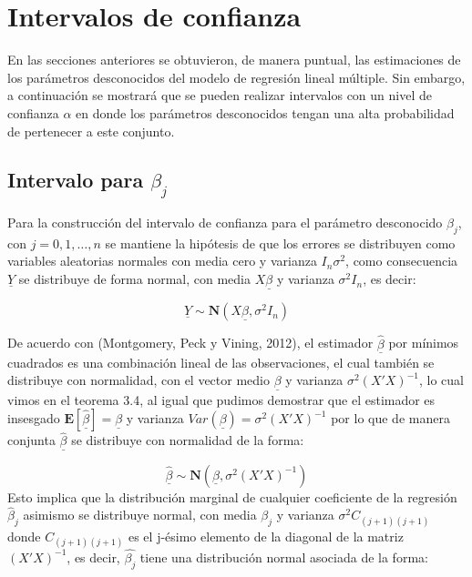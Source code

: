 \documentclass[
  a4paper,
  oneside,
  openany]{book}
\begin{document}
\hypertarget{intervalos-de-confianza-2}{%
\chapter{Intervalos de confianza}\label{intervalos-de-confianza-2}}

En las secciones anteriores se obtuvieron, de manera puntual, las estimaciones de los parámetros desconocidos del modelo de regresión lineal múltiple. Sin embargo, a continuación se mostrará que se pueden realizar intervalos con un nivel de confianza \(\alpha\) en donde los parámetros desconocidos tengan una alta probabilidad de pertenecer a este conjunto.

\hypertarget{intervalo-para-beta_j}{%
\section{\texorpdfstring{Intervalo para \(\beta_{j}\)}{Intervalo para \textbackslash beta\_\{j\}}}\label{intervalo-para-beta_j}}

Para la construcción del intervalo de confianza para el parámetro desconocido \(\beta_{j}\), con \(j=0,1,\ldots,n\) se mantiene la hipótesis de que los errores se distribuyen como variables aleatorias normales con media cero y varianza \(I_{n}\sigma^2\), como consecuencia \(\underline{Y}\) se distribuye de forma normal, con media \(X\underline{\beta}\) y varianza \(\sigma^2 I_{n}\), es decir:

\[\underline{Y} \sim \mathbf{N}(X\underline{\beta},\sigma^2 I_{n})\]

De acuerdo con (Montgomery, Peck y Vining, 2012), el estimador \(\underline{\hat{\beta}}\) por mínimos cuadrados es una combinación lineal de las observaciones, el cual también se distribuye con normalidad, con el vector medio \(\underline{\beta}\) y varianza \(\sigma^2(X'X)^{-1}\), lo cual vimos en el teorema 3.4, al igual que pudimos demostrar que el estimador es insesgado \(\mathbf{E}[\underline{\hat{\beta}}]=\underline{\beta}\) y varianza \(Var(\underline{\beta})=\sigma^2(X'X)^{-1}\) por lo que de manera conjunta \(\underline{\hat{\beta}}\) se distribuye con normalidad de la forma:

\[\underline{\hat{\beta}} \sim \mathbf{N}(\underline{\beta},\sigma^2(X'X)^{-1})\]
Esto implica que la distribución marginal de cualquier coeficiente de la regresión \(\hat{\beta}_{j}\) asimismo se distribuye normal, con media \(\beta_{j}\) y varianza \(\sigma^2 C_{(j+1)(j+1)}\) donde \(C_{(j+1)(j+1)}\) es el j-ésimo elemento de la diagonal de la matriz \((X'X)^{-1}\), es decir, \(\hat{\beta_{j}}\) tiene una distribución normal asociada de la forma:
\end{document}
